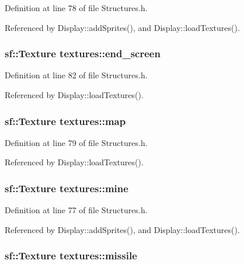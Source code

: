 Definition at line 78 of file Structures.\-h.



Referenced by Display\-::add\-Sprites(), and Display\-::load\-Textures().

\hypertarget{structtextures_a6cb62efe7a4e59ebdc681261f22b8cae}{
\subsubsection[{end\-\_\-screen}]{\setlength{\rightskip}{0pt plus 5cm}sf\-::\-Texture textures\-::end\-\_\-screen}}\label{structtextures_a6cb62efe7a4e59ebdc681261f22b8cae}


Definition at line 82 of file Structures.\-h.



Referenced by Display\-::load\-Textures().

\hypertarget{structtextures_a703e4f064d67c1cee84ba8560a6104c6}{
\subsubsection[{map}]{\setlength{\rightskip}{0pt plus 5cm}sf\-::\-Texture textures\-::map}}\label{structtextures_a703e4f064d67c1cee84ba8560a6104c6}


Definition at line 79 of file Structures.\-h.



Referenced by Display\-::load\-Textures().

\hypertarget{structtextures_a7f5b6643fd47d1bd8d5758c24c32dc9e}{
\subsubsection[{mine}]{\setlength{\rightskip}{0pt plus 5cm}sf\-::\-Texture textures\-::mine}}\label{structtextures_a7f5b6643fd47d1bd8d5758c24c32dc9e}


Definition at line 77 of file Structures.\-h.



Referenced by Display\-::add\-Sprites(), and Display\-::load\-Textures().

\hypertarget{structtextures_a1d12557e92da80a9809f037edfe72f2f}{
\subsubsection[{missile}]{\setlength{\rightskip}{0pt plus 5cm}sf\-::\-Texture textures\-::missile}}\label{structtextures_a1d12557e92da80a9809f037edfe72f2f}


